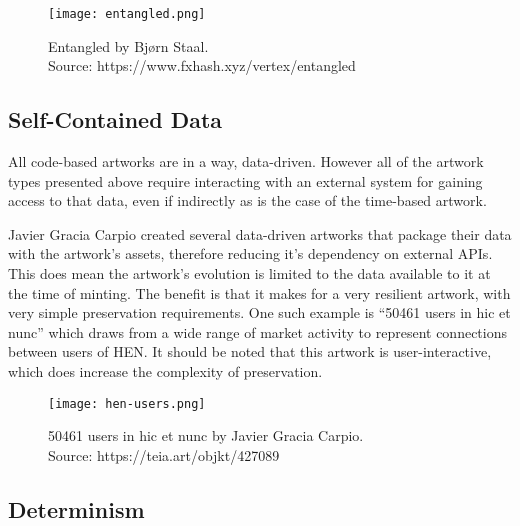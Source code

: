 \begin{figure}[h]
    \centering
    \captionsetup{justification=centering}
    \texttt{[image: entangled.png]}
    \captionsetup{justification=centering}
    \caption[Entangled by Bjørn Staal]{Entangled by Bjørn Staal. \\ Source: https://www.fxhash.xyz/vertex/entangled}
    \label{fig:detachment}
\end{figure}


\subsection{Self-Contained Data}

All code-based artworks are in a way, data-driven. However all of the artwork types presented above require interacting with an external system for gaining access to that data, even if indirectly as is the case of the time-based artwork.

Javier Gracia Carpio created several data-driven artworks that package their data with the artwork's assets, therefore reducing it's dependency on external APIs. This does mean the artwork's evolution is limited to the data available to it at the time of minting. The benefit is that it makes for a very resilient artwork, with very simple preservation requirements. One such example is ``50461 users in hic et nunc'' which draws from a wide range of market activity to represent connections between users of HEN. It should be noted that this artwork is user-interactive, which does increase the complexity of preservation.

\begin{figure}[H]
    \centering
    \captionsetup{justification=centering}
    \texttt{[image: hen-users.png]}
    \captionsetup{justification=centering}
    \caption[50461 users in hic et nunc by Javier Gracia Carpio]{50461 users in hic et nunc by Javier Gracia Carpio. \\ Source: https://teia.art/objkt/427089}
    \label{fig:hen-users}
\end{figure}


\subsection{Determinism}

